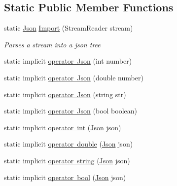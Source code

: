 \subsection*{Static Public Member Functions}
\begin{DoxyCompactItemize}
\item 
static \mbox{\hyperlink{class_eagle_eye_1_1_models_1_1_json}{Json}} \mbox{\hyperlink{class_eagle_eye_1_1_models_1_1_json_ae79a899679f529bfebb18683afd1c9d1}{Import}} (Stream\+Reader stream)
\begin{DoxyCompactList}\small\item\em Parses a stream into a json tree \end{DoxyCompactList}\item 
static implicit \mbox{\hyperlink{class_eagle_eye_1_1_models_1_1_json_a2116f2d9d1d806f4cdc6afee774b7945}{operator Json}} (int number)
\item 
static implicit \mbox{\hyperlink{class_eagle_eye_1_1_models_1_1_json_a2a8bcde77f6eacf7e1b80e69cdbf71dd}{operator Json}} (double number)
\item 
static implicit \mbox{\hyperlink{class_eagle_eye_1_1_models_1_1_json_a5c1034bc7b7079844e4a1a22af60e098}{operator Json}} (string str)
\item 
static implicit \mbox{\hyperlink{class_eagle_eye_1_1_models_1_1_json_aae9601c0e30fb42bab9eebfa7493bf37}{operator Json}} (bool boolean)
\item 
static implicit \mbox{\hyperlink{class_eagle_eye_1_1_models_1_1_json_a2af5ba2026820d0c8fdc671ee0b46a4d}{operator int}} (\mbox{\hyperlink{class_eagle_eye_1_1_models_1_1_json}{Json}} json)
\item 
static implicit \mbox{\hyperlink{class_eagle_eye_1_1_models_1_1_json_aa26017e55f0d47af0b446c02c0899102}{operator double}} (\mbox{\hyperlink{class_eagle_eye_1_1_models_1_1_json}{Json}} json)
\item 
static implicit \mbox{\hyperlink{class_eagle_eye_1_1_models_1_1_json_adddb99cd1e17f4bd10547a6178f61288}{operator string}} (\mbox{\hyperlink{class_eagle_eye_1_1_models_1_1_json}{Json}} json)
\item 
static implicit \mbox{\hyperlink{class_eagle_eye_1_1_models_1_1_json_a396aab5debc375cb57b9e2ce58c932fd}{operator bool}} (\mbox{\hyperlink{class_eagle_eye_1_1_models_1_1_json}{Json}} json)
\end{DoxyCompactItemize}
